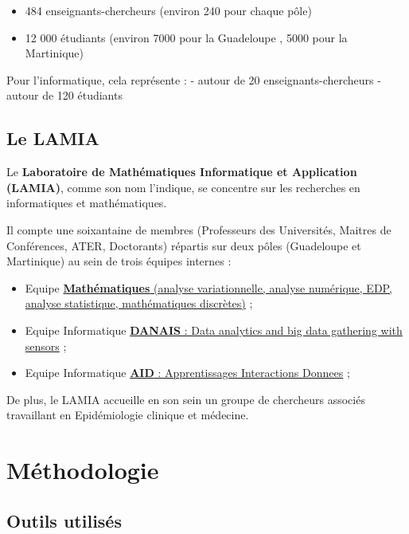 \begin{itemize}
\tightlist
\item
  484 enseignants-chercheurs (environ 240 pour chaque pôle)
\item
  12 000 étudiants (environ 7000 pour la Guadeloupe , 5000 pour la
  Martinique)
\end{itemize}

Pour l'informatique, cela représente : - autour de 20
enseignants-chercheurs - autour de 120 étudiants

\hypertarget{le-lamia}{%
\subsection{Le LAMIA}\label{le-lamia}}

Le \textbf{Laboratoire de Mathématiques Informatique et Application
(LAMIA)}, comme son nom l'indique, se concentre sur les recherches en
informatiques et mathématiques.

Il compte une soixantaine de membres (Professeurs des Universités,
Maitres de Conférences, ATER, Doctorants) répartis sur deux pôles
(Guadeloupe et Martinique) au sein de trois équipes internes :

\begin{itemize}
\tightlist
\item
  Equipe
  \href{http://lamia.univ-ag.fr/index.php?page=equipe-mathematiques}{\textbf{Mathématiques}
  (analyse variationnelle, analyse numérique, EDP, analyse statistique,
  mathématiques discrètes)} ;
\item
  Equipe Informatique
  \href{http://lamia.univ-ag.fr/index.php?page=equipe-danais}{\textbf{DANAIS}
  : Data analytics and big data gathering with sensors} ;
\item
  Equipe Informatique
  \href{http://lamia.univ-ag.fr/index.php?page=equipe-aid}{\textbf{AID}
  : Apprentissages Interactions Donnees} ;
\end{itemize}

De plus, le LAMIA accueille en son sein un groupe de chercheurs associés
travaillant en Epidémiologie clinique et médecine.


%

\hypertarget{Méthodologie}{%
\section{Méthodologie}\label{Méthodologie}}

\subsection{Outils utilisés}

